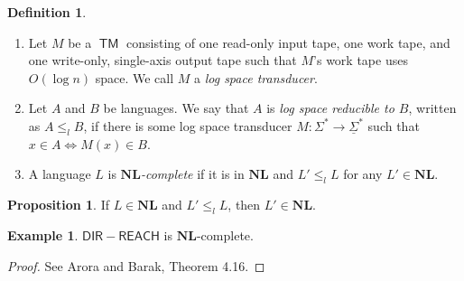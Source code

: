 \documentclass[10pt,letterpaper,cm]{nupset}
\theoremstyle{definition}
\newtheorem*{definition}{Definition}
\newtheorem{exmp}{Example}
\newtheorem{prop}{Proposition}
\newcommand{\1}{\mathbf{1}}
\newcommand{\0}{\vec 0}
\DeclareMathOperator{\TM}{\mathsf{TM}}
\begin{document}
\begin{definition} $ $
\begin{enumerate}
\item
Let $M$ be a $\TM$ consisting of one read-only input tape, one work tape, and one write-only, single-axis output tape such that $M$'s work tape uses $O(\log{n})$ space. We call $M$ a \textit{log space transducer}.
\item Let $A$ and $B$ be languages. We say that $A$ is \textit{log space reducible to $B$}, written as $A\leq_l B$, if there is some log space transducer $M: \Sigma^{\ast} \to \underline{\Sigma}^{\ast}$ such that $x \in A \iff M(x) \in B$. 
\item A language $L$ is \textit{$\mathbf{NL}$-complete} if it is in $\mathbf{NL}$ and $L' \leq_l L$ for any $L' \in \mathbf{NL}$.
\end{enumerate}
\end{definition}

\begin{prop}
If $L \in \mathbf{NL}$ and $L' \leq_l L$, then  $L' \in \mathbf{NL}$.
\end{prop}

\begin{exmp}
$\mathsf{DIR{-}REACH}$ is $\mathbf{NL}$-complete. 
\end{exmp}
\begin{proof}
See Arora and Barak, Theorem 4.16.
\end{proof}
\end{document}

